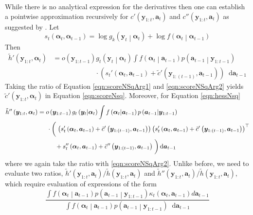 \documentclass[notitlepage]{article}
\renewcommand{\vec}[1]{\bm{#1}}
\newcommand{\Lparen}[1]{\left( #1\right)}
\newcommand{\Cond}[2]{ #1 \middle\vert  #2}
\newcommand*\diff{\mathop{}\!\mathrm{d}}
\newcommand{\optor}[2]{#1\Lparen{#2}}
\newcommand{\optorC}[3]{\optor{#1}{\Cond{#2}{#3}}}
\begin{document}
While there is no analytical expression for the derivatives then one can 
establish a pointwise approximation recursively
for $c'\Lparen{\vec y_{1:t}, \vec a_t}$ and $c''\Lparen{\vec y_{1:t}, \vec a_t}$ 
as suggested by \cite{poyiadjis11}. Let%
%
$$
s_t\Lparen{\vec\alpha_t, \vec\alpha_{t - 1}} 
	= \log\optorC{g_k}{\vec y_t}{\vec \alpha_t} + 
		\log\optorC{f}{\vec\alpha_t}{\vec\alpha_{t - 1}}
$$%
% 
Then 
%
\begin{align}
\tilde h'\Lparen{\vec y_{1:t}, \vec\alpha_t}
	&= o\Lparen{\vec y_{1:{t - 1}}}\optorC{g_t}{\vec y_t}{\vec\alpha_t}
	\int \optorC{f}{\vec\alpha_t}{\vec a_{t - 1}}
		\optorC{p}{\vec a_{t - 1}}{\vec y_{1:{t - 1}}} \label{eqn:scoreNSqArg1}\\
&\hspace{75pt}\cdot
		\Lparen{s_t'\Lparen{\vec\alpha_t, \vec a_{t - 1}}
			+
		\tilde c'\Lparen{\vec y_{1:(t - 1)}, \vec a_{t - 1}}}
		\diff\vec a_{t - 1} \nonumber
\end{align}%
%
Taking the ratio of Equation \eqref{eqn:scoreNSqArg1} and \eqref{eqn:scoreNSqArg2}
yields $\tilde c'\Lparen{\vec y_{1:t}, \vec\alpha_t}$ in Equation \eqref{eqn:scoreNsq}.
Moreover, for Equation \eqref{eqn:hessNsq} %
%
\begin{align*}
\tilde h''\Lparen{\vec y_{1:t}, \vec\alpha_t}
	&= o\Lparen{\vec y_{1:{t - 1}}}\optorC{g_t}{\vec y_t}{\vec\alpha_t}
	\int\optorC{f}{\vec\alpha_t}{\vec a_{t - 1}}
	\optorC{p}{\vec a_{t - 1}}{\vec y_{1:{t - 1}}}\nonumber\\
&\hspace{15pt}\cdot
		\left(\vphantom{\int}\right.
		\Lparen{s_t'\Lparen{\vec\alpha_t, \vec a_{t - 1}}
			+ \tilde c'\Lparen{\vec y_{1:(t - 1)}, \vec a_{t - 1}}} 
		\Lparen{s_t'\Lparen{\vec\alpha_t, \vec a_{t - 1}}
			+ \tilde c'\Lparen{\vec y_{1:(t - 1)}, \vec a_{t - 1}}}^\top \\
&\hspace{28pt}+
		s_t''\Lparen{\vec\alpha_t, \vec a_{t - 1}} + 
		\tilde c''\Lparen{\vec y_{1:(t - 1)}, \vec a_{t - 1}}
		\left.\vphantom{\int}\right)\diff\vec a_{t - 1}\nonumber
\end{align*}%
% 
where we again take the ratio with \eqref{eqn:scoreNSqArg2}. Unlike before, 
we need to evaluate two ratios, 
$\tilde h'\Lparen{\vec y_{1:t}, \vec a_t}/\tilde h\Lparen{\vec y_{1:t}, \vec a_t}$
and
$\tilde h''\Lparen{\vec y_{1:t}, \vec a_t}/\tilde h\Lparen{\vec y_{1:t}, \vec a_t}$, 
which require evaluation of expressions of the form%
%
\begin{equation}\label{eqn:NsqNeedApprox}
\frac{\int\optorC{f}{\vec\alpha_t}{\vec a_{t - 1}}
	\optorC{p}{\vec a_{t - 1}}{\vec y_{1:{t - 1}}}
	\kappa_t\Lparen{\vec\alpha_t, \vec a_{t - 1}}
	d\vec a_{t - 1}}{
	\int\optorC{f}{\vec\alpha_t}{\vec a_{t - 1}}
	\optorC{p}{\vec a_{t - 1}}{\vec y_{1:{t - 1}}}
	\diff\vec a_{t - 1}}
\end{equation}%
\end{document}

